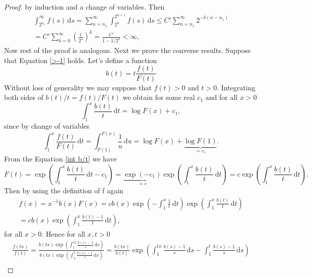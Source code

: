 \documentclass[english,12pt,a4paper,pdftex,sci,utf8]{aaltothesis} %
\begin{document}
\begin{proof}
by induction and a change of variables. Then
\begin{equation*}
\begin{split}
\int_{2^{n_1}}^{\infty} f(s)\,\mathrm{d}s = \sum_{n=n_1}^{\infty} \int_{2^{n}}^{2^{n+1}} f(s)\,\mathrm{d}s \leq C' \sum_{n=n_1}^{\infty} 2^{-\delta(n-n_1)} \\
=C' \sum_{k=0}^{\infty} \left( \frac{1}{2^{\delta}}\right)^k = \frac{C'}{1-1/2^{\delta}}<\infty,
\end{split}
\end{equation*}
Now rest of the proof is analogous. Next we prove the converse results. Suppose that Equation \eqref{>-1} holds. Let's define a function
\begin{equation*}
b(t) = t\frac{f(t)}{F(t)}
\end{equation*}
Without loss of generality we may suppose that $f(t)>0$ and $t>0$. Integrating both sides of $b(t)/t=f(t)/F(t)$ we obtain for some real $c_1$ and for all $x>0$
\begin{equation}
\int_{1}^{x} \frac{b(t)}{t}\,\mathrm{d}t = \log F(x) + c_1,
\label{int b/t}
\end{equation}
since by change of variables
\begin{equation*}
\int_{1}^{x} \frac{f(t)}{F(t)}\,\mathrm{d}t = \int_{F(1)}^{F(x)} \frac{1}{u}\,\mathrm{d}u = \log F(x) + \underbrace{\log F(1)}_{=c_1}.
\end{equation*}
From the Equation \eqref{int b/t} we have
\begin{equation*}
F(t) = \exp \left( \int_1^x \frac{b(t)}{t}\,\mathrm{d}t-c_1 \right) =\underbrace{\exp(-c_1)}_{=c} \exp \left( \int_1^x \frac{b(t)}{t}\,\mathrm{d}t\right) =c \exp \left( \int_1^x \frac{b(t)}{t}\,\mathrm{d}t\right).
\end{equation*}
Then by using the definition of f again
\begin{equation}
\begin{split}
f(x)=x^{-1}b(x)F(x)=cb(x)\exp \left( -\int_1^x \frac{1}{t} \,\mathrm{d}t\right) \exp \left( \int_1^x \frac{b(t)}{t} \,\mathrm{d}t\right)\\
=cb(x)\exp \left( \int_1^x \frac{b(t)-1}{t}\,\mathrm{d}t\right),
\label{frep}
\end{split}
\end{equation}
for all $x>0$. Hence for all $x,t>0$
\begin{equation*}
\begin{split}
\frac{f(tx)}{f(t)}=\frac{b(tx)\exp \left( \int_1^{tx} \frac{b(s)-1}{s}\,\mathrm{d}s\right)}{b(tx)\exp \left( \int_1^{t} \frac{b(s)-1}{s}\,\mathrm{d}s\right)} = \frac{b(tx)}{b(t)} \exp \left( \int_1^{tx} \frac{b(s)-1}{s}\,\mathrm{d}s - \int_1^{t} \frac{b(s)-1}{s}\,\mathrm{d}s\right) \\

\end{split}
\end{equation*}
\end{proof}
\end{document}
